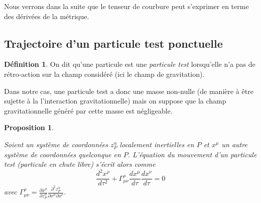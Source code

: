 \documentclass[a4paper,11pt]{report}
\theoremstyle{definition}
\theoremstyle{plain}
\newtheorem{prop}[thm]{Proposition}
\theoremstyle{definition}
\newtheorem{defn}{Définition}[chapter]
\theoremstyle{remark}
\newcommand{\p}{\partial}
\begin{document}
            Nous verrons dans la suite que le tenseur de courbure peut s'exprimer en terme des dérivées de la métrique.
    
        \subsection{Trajectoire d'un particule test ponctuelle}
        
            \begin{defn}
                On dit qu'une particule est une \textit{particule test} lorsqu'elle n'a pas de rétro-action sur la champ considéré (ici le champ de gravitation).
            \end{defn}
            
            Dans notre cas, une particule test a donc une masse non-nulle (de manière à être sujette à la l'interaction gravitationnelle) mais on suppose que la champ gravitationnelle généré par cette masse est négligeable.
            
            \begin{prop}\begin{leftbar}
                Soient un système de coordonnées $z^\alpha_P$ localement inertielles en $P$ et $x^\mu$ un autre système de coordonnées quelconque en $P$. L'équation du mouvement d'un particule test (particule en chute libre) s'écrit alors comme
                \begin{equation}
                    \frac{d^2x^\rho}{d\tau^2}+\Gamma^\rho_{\mu\nu}\frac{dx^\mu}{d\tau}\frac{dx^\nu}{d\tau} = 0
                \end{equation}
                avec $\Gamma^\rho_{\mu\nu} = \frac{\p x^\rho}{\p z^\alpha_P}\frac{\p^2 z^\alpha_P}{\p x^\mu\p x^\nu}$.
            \end{leftbar}\end{prop}
            
\end{document}
